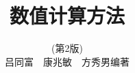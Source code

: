 

\title{数值计算方法\\{\vspace*{0.1em}}}
\author{(第2版)\\\vspace*{0.2em}吕同富~~康兆敏~~方秀男\hspace{1em}编著}

\maketitle


